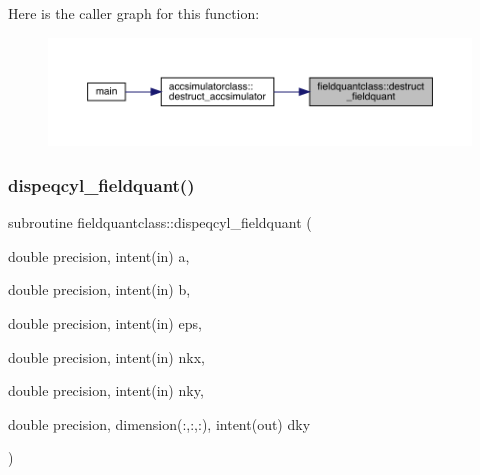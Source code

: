 Here is the caller graph for this function\+:\nopagebreak
\begin{figure}[H]
\begin{center}
\leavevmode
\includegraphics[width=350pt]{namespacefieldquantclass_a4e8922c1e25eef99306f4001c7289ba0_icgraph}
\end{center}
\end{figure}
\mbox{\label{namespacefieldquantclass_ac9b2b94f5051c235120e16bd55e0148d}} 
\subsubsection{\texorpdfstring{dispeqcyl\_fieldquant()}{dispeqcyl\_fieldquant()}}
{\footnotesize\ttfamily subroutine fieldquantclass\+::dispeqcyl\+\_\+fieldquant (\begin{DoxyParamCaption}\item[{double precision, intent(in)}]{a,  }\item[{double precision, intent(in)}]{b,  }\item[{double precision, intent(in)}]{eps,  }\item[{double precision, intent(in)}]{nkx,  }\item[{double precision, intent(in)}]{nky,  }\item[{double precision, dimension(\+:,\+:,\+:), intent(out)}]{dky }\end{DoxyParamCaption})}

